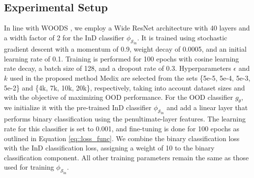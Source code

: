 \documentclass[10pt]{article} %
\theoremstyle{plain}
\theoremstyle{definition}
\begin{document}
\subsection{Experimental Setup}
In line with WOODS \citep{pmlr-v162-katz-samuels22a}, we employ a Wide ResNet architecture \citep{zagoruyko2016wide} with 40 layers and a width factor of 2 for the InD classifier \( \phi_{\mathcal{S}_{\text{in}}} \). It is trained using stochastic gradient descent with a momentum of 0.9, weight decay of 0.0005, and an initial learning rate of 0.1. Training is performed for 100 epochs with cosine learning rate decay, a batch size of 128, and a dropout rate of 0.3. 
Hyperparameters $\epsilon$ and $k$ used in the proposed method Medix are selected from the sets \{5e-5, 5e-4, 5e-3, 5e-2\} and \{4k, 7k, 10k, 20k\}, respectively, taking into account dataset sizes and with the objective of maximizing OOD performance.
For the OOD classifier \( g_{\theta} \), we initialize it with the pre-trained InD classifier \( \phi_{\mathcal{S}_{\text{in}}}\) and add a linear layer that performs binary classification using the penultimate-layer features. The learning rate for this classifier is set to 0.001, and fine-tuning is done for 100 epochs as outlined in Equation \ref{eq::loss_func}. We combine the binary classification loss with the InD classification loss, assigning a weight of 10 to the binary classification component. All other training parameters remain the same as those used for training \( \phi_{\mathcal{S}_{\text{in}}} \).
\end{document}
